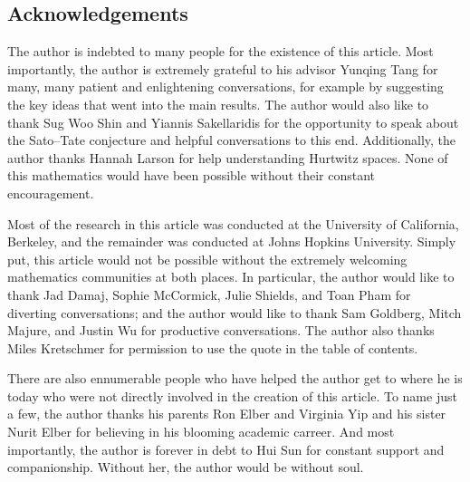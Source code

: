 \documentclass[openany]{book}
\begin{document}
\subsection{Acknowledgements}
The author is indebted to many people for the existence of this article. Most importantly, the author is extremely grateful to his advisor Yunqing Tang for many, many patient and enlightening conversations, for example by suggesting the key ideas that went into the main results. The author would also like to thank Sug Woo Shin and Yiannis Sakellaridis for the opportunity to speak about the Sato--Tate conjecture and helpful conversations to this end. Additionally, the author thanks Hannah Larson for help understanding Hurtwitz spaces. None of this mathematics would have been possible without their constant encouragement.

Most of the research in this article was conducted at the University of California, Berkeley, and the remainder was conducted at Johns Hopkins University. Simply put, this article would not be possible without the extremely welcoming mathematics communities at both places. In particular, the author would like to thank Jad Damaj, Sophie McCormick, Julie Shields, and Toan Pham for diverting conversations; and the author would like to thank Sam Goldberg, Mitch Majure, and Justin Wu for productive conversations. The author also thanks Miles Kretschmer for permission to use the quote in the table of contents.

There are also ennumerable people who have helped the author get to where he is today who were not directly involved in the creation of this article. To name just a few, the author thanks his parents Ron Elber and Virginia Yip and his sister Nurit Elber for believing in his blooming academic carreer. And most importantly, the author is forever in debt to Hui Sun for constant support and companionship. Without her, the author would be without soul.



% 








\nirprintbib
\nirprintindex
\end{document}
